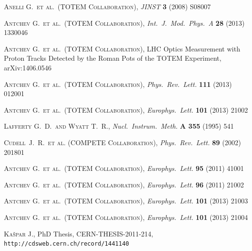 \documentclass[twocolumn,a4paper,superscriptaddress,preprintnumbers,showpacs,nofootinbib]{revtex4-1}
\def\etal{et al.}
\def\Name#1{\textsc{#1}, }
\def\REVIEW#1#2#3#4{{\it #1} {\bf #2} (#3) #4}
\begin{document}
\begin{thebibliography}{99}

	\Name{Anelli G.~\etal{}~(TOTEM Collaboration)}
	\REVIEW{JINST}{3}{2008}{S08007}

	\Name{Antchev G.~\etal{}~(TOTEM Collaboration)}
	\REVIEW{Int.~J.~Mod.~Phys.~A}{28}{2013}{1330046}

	\Name{Antchev G.~\etal{}~(TOTEM Collaboration)}
	LHC Optics Measurement with Proton Tracks Detected by the Roman Pots of the TOTEM Experiment, 
	arXiv:1406.0546

	\Name{Antchev G.~\etal{}~(TOTEM Collaboration)}
	\REVIEW{Phys.~Rev.~Lett.}{111}{2013}{012001}

	\Name{Antchev G.~\etal{}~(TOTEM Collaboration)}
	\REVIEW{Europhys.~Lett.}{101}{2013}{21002}

	\Name{Lafferty G.~D.~and Wyatt T.~R.}
	\REVIEW{Nucl.\ Instrum.\ Meth.}{A 355}{1995}{541}

	\Name{Cudell~J.~R.~\etal{} (COMPETE Collaboration)}
	\REVIEW{Phys.\ Rev.\ Lett.}{89}{2002}{201801}


\iffalse

	\Name{Antchev G.~\etal{}~(TOTEM Collaboration)}
	\REVIEW{Europhys.~Lett.}{95}{2011}{41001}

	\Name{Antchev G.~\etal{}~(TOTEM Collaboration)}
	\REVIEW{Europhys.~Lett.}{96}{2011}{21002}

	\Name{Antchev G.~\etal{}~(TOTEM Collaboration)}
	\REVIEW{Europhys.~Lett.}{101}{2013}{21003}

	\Name{Antchev G.~\etal{}~(TOTEM Collaboration)}
	\REVIEW{Europhys.~Lett.}{101}{2013}{21004}

	\Name{Ka\v spar J.}
	PhD Thesis, CERN-THESIS-2011-214, {\tt http://cdsweb.cern.ch/record/1441140}


\end{thebibliography}
\end{document}
